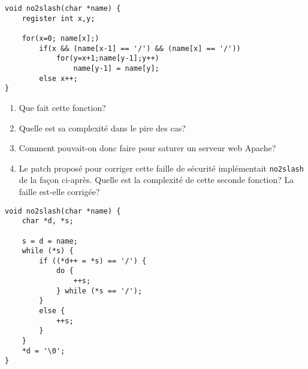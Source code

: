 \documentclass[a4paper,10pt]{article}
\begin{document}
\begin{verbatim}
void no2slash(char *name) {
    register int x,y;

    for(x=0; name[x];)
        if(x && (name[x-1] == '/') && (name[x] == '/'))
            for(y=x+1;name[y-1];y++)
                name[y-1] = name[y];
        else x++;
}
\end{verbatim}

\begin{enumerate}
\item Que fait cette fonction?
\item Quelle est sa complexité dans le pire des cas?
\item Comment pouvait-on donc faire pour saturer un serveur web Apache?
\item Le patch proposé pour corriger cette faille de sécurité implémentait
\texttt{no2slash} de la façon ci-après. Quelle est la complexité de cette seconde fonction? La faille est-elle corrigée?
\end{enumerate}

\begin{verbatim}
void no2slash(char *name) {
    char *d, *s;

    s = d = name;
    while (*s) {
        if ((*d++ = *s) == '/') {
            do {
                ++s;
            } while (*s == '/');
        }
        else {
            ++s;
        }
    }
    *d = '\0';
}
\end{verbatim}
\end{document}
